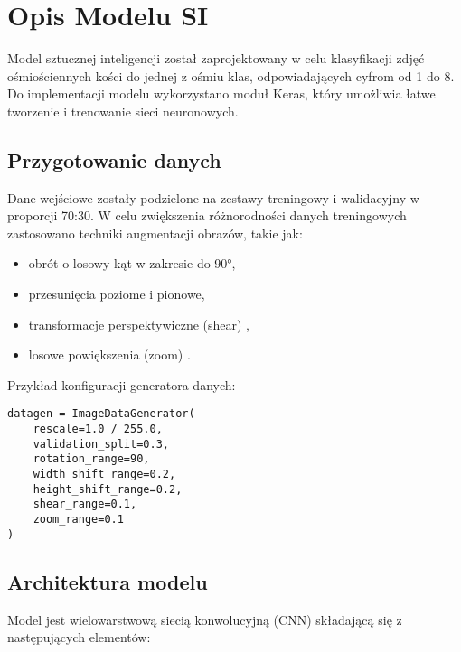 \section{Opis Modelu SI}\label{sec:opis-modelu-si}

Model sztucznej inteligencji został zaprojektowany w celu klasyfikacji zdjęć ośmiościennych kości do jednej z ośmiu klas, odpowiadających cyfrom od 1 do 8.
Do implementacji modelu wykorzystano moduł Keras, który umożliwia łatwe tworzenie i trenowanie sieci neuronowych.

\subsection{Przygotowanie danych}\label{subsec:przygotowanie-danych}

Dane wejściowe zostały podzielone na zestawy treningowy i walidacyjny w proporcji 70:30.
W celu zwiększenia różnorodności danych treningowych zastosowano techniki augmentacji obrazów, takie jak:

\begin{itemize}
    \item obrót o losowy kąt w zakresie do 90°,
    \item przesunięcia poziome i pionowe,
    \item transformacje perspektywiczne (shear) ,
    \item losowe powiększenia (zoom) .
\end{itemize}

Przykład konfiguracji generatora danych:

\begin{verbatim}
datagen = ImageDataGenerator(
    rescale=1.0 / 255.0,
    validation_split=0.3,
    rotation_range=90,
    width_shift_range=0.2,
    height_shift_range=0.2,
    shear_range=0.1,
    zoom_range=0.1
)
\end{verbatim}

\subsection{Architektura modelu}\label{subsec:architektura-modelu}

Model jest wielowarstwową siecią konwolucyjną (CNN) składającą się z następujących elementów:

